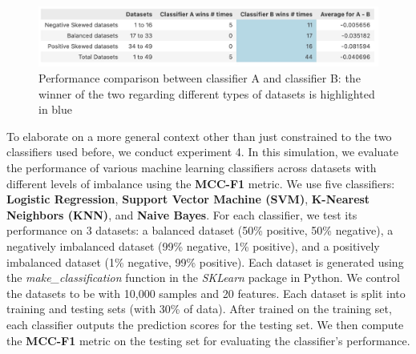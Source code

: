 \documentclass[12pt, oneside]{amsart}
\theoremstyle{definition}
\theoremstyle{remark}
\numberwithin{equation}{section}
\begin{document}
\begin{figure}[hbt!]
    \centering
    \includegraphics[scale=0.3]{Report/Figure/simulation1_table.jpg}
    \caption{Performance comparison between classifier A and classifier B: the winner of the two regarding different types of datasets is highlighted in blue}
    \label{simulation1_table}
\end{figure}
\FloatBarrier

To elaborate on a more general context other than just constrained to the two classifiers used before, we conduct experiment 4. In this simulation, we evaluate the performance of various machine learning classifiers across datasets with different levels of imbalance using the \textbf{MCC-F1} metric. We use five classifiers: \textbf{Logistic Regression}, \textbf{Support Vector Machine (SVM)}, \textbf{K-Nearest Neighbors (KNN)}, and \textbf{Naive Bayes}. For each classifier, we test its performance on 3 datasets: a balanced dataset (50\% positive, 50\% negative), a negatively imbalanced dataset (99\% negative, 1\% positive), and a positively imbalanced dataset (1\% negative, 99\% positive). Each dataset is generated using the \textit{make\_classification} function in the \textit{SKLearn} package in Python. We control the datasets to be with 10,000 samples and 20 features. Each dataset is split into training and testing sets (with 30\% of data). After trained on the training set, each classifier outputs the prediction scores for the testing set. We then compute the \textbf{MCC-F1} metric on the testing set for evaluating the classifier's performance.\\
\end{document}

